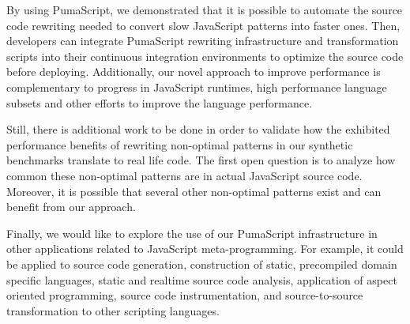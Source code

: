\documentclass[preprint,10pt]{sigplanconf}
\begin{document}
By using PumaScript, we demonstrated that it is possible to automate the source code rewriting needed to convert slow JavaScript patterns into faster ones. Then, developers can integrate PumaScript rewriting infrastructure and transformation scripts into their continuous integration environments to optimize the source code before deploying. Additionally, our novel approach to improve performance is complementary to progress in JavaScript runtimes, high performance language subsets and other efforts to improve the language performance.

Still, there is additional work to be done in order to validate how the exhibited performance benefits of rewriting non-optimal patterns in our synthetic benchmarks translate to real life code. The first open question is to analyze how common these non-optimal patterns are in actual JavaScript source code. Moreover, it is possible that several other non-optimal patterns exist and can benefit from our approach.

Finally, we would like to explore the use of our PumaScript infrastructure in other applications related to JavaScript meta-programming. For example, it could be applied to source code generation, construction of static, precompiled domain specific languages, static and realtime source code analysis, application of aspect oriented programming, source code instrumentation, and source-to-source transformation to other scripting languages.









\end{document}

